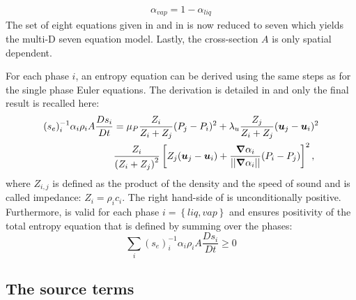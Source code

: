 %
\begin{align}
 \alpha_{vap}= 1 - \alpha_{liq}
\end{align}
%
The set of eight equations given in  and in  is now reduced to seven which yields the multi-D seven equation model. Lastly, the cross-section $A$ is only spatial dependent. 

For each phase $i$, an entropy equation can be derived using the same steps as for the single phase Euler equations. The derivation is detailed in  and only the final result is recalled here:
%
\begin{align}\label{eq:ent-eqn-7-eqn-model}
(s_{e})_i^{-1} \alpha_i \rho_i A \frac{Ds_i}{Dt} &= \mu_P \frac{Z_i}{Z_i+Z_j} (P_j - P_i)^2 + \lambda_u \frac{Z_j}{Z_i+Z_j} (\boldsymbol u_j -\boldsymbol u_i)^2 \nonumber
\\
& \frac{Z_i}{\left( Z_i+Z_j \right)^2} \left[ Z_j (\boldsymbol u_j-\boldsymbol u_i)+\frac{\boldsymbol{\nabla} \alpha_i}{|| \boldsymbol{\nabla} \alpha_i ||}(P_i-P_j)\right]^2,
\end{align}
where $Z_{i,j}$ is defined as the product of the density and the speed of sound and is called impedance: $Z_i = \rho_i c_i$.
The right hand-side of  is unconditionally positive. Furthermore,  is valid for each phase $i=\left\{liq, vap \right\}$ and ensures positivity of the total entropy equation that is defined by summing over the phases:
%
\begin{equation}
\sum_i (s_{e})_i^{-1} \alpha_i \rho_i A \frac{Ds_i}{Dt} \geq 0
\end{equation}
%
\subsection{The source terms}\label{sec:source-terms-7-eqt-sect5}
